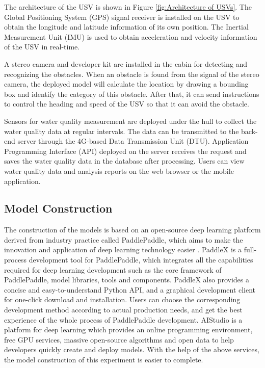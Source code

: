 \documentclass[sensors,article,submit,moreauthors,pdftex]{Definitions/mdpi}
\begin{document}
\begin{paracol}{2}
The architecture of the USV is shown in Figure \ref{fig:Architecture of USVs}. The Global Positioning System (GPS) signal receiver is installed on the USV to obtain the longitude and latitude information of its own position. The Inertial Measurement Unit (IMU) is used to obtain acceleration and velocity information of the USV in real-time.

A stereo camera and developer kit are installed in the cabin for detecting and recognizing the obstacles. When an obstacle is found from the signal of the stereo camera, the deployed model will calculate the location by drawing a bounding box and identify the category of this obstacle. After that, it can send instructions to control the heading and speed of the USV so that it can avoid the obstacle.

Sensors for water quality measurement are deployed under the hull to collect the water quality data at regular intervals. The data can be transmitted to the back-end server through the 4G-based Data Transmission Unit (DTU). Application Programming Interface (API) deployed on the server receives the request and saves the water quality data in the database after processing. Users can view water quality data and analysis reports on the web browser or the mobile application.



\subsection{Model Construction}

The construction of the models is based on an open-source deep learning platform derived from industry practice called PaddlePaddle, which aims to make the innovation and application of deep learning technology easier \cite{ma2019paddlepaddle}.
PaddleX is a full-process development tool for PaddlePaddle, which integrates all the capabilities required for deep learning development such as the core framework of PaddlePaddle, model libraries, tools and components. PaddleX also provides a concise and easy-to-understand Python API, and a graphical development client for one-click download and installation. Users can choose the corresponding development method according to actual production needs, and get the best experience of the whole process of PaddlePaddle development. AIStudio is a platform for deep learning which provides an online programming environment, free GPU services, massive open-source algorithms and open data to help developers quickly create and deploy models. 
With the help of the above services, the model construction of this experiment is easier to complete.


\end{paracol}
\end{document}
